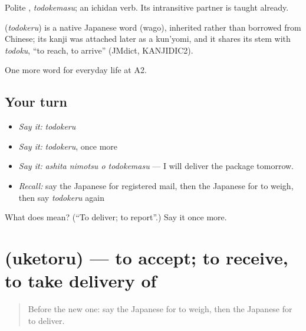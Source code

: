Polite \textbf{}, \emph{todokemasu}; an ichidan verb. Its intransitive partner \textbf{} is taught already.

\begin{cousinweb}
\textbf{} (\emph{todokeru}) is a native Japanese word (wago), inherited rather than borrowed from Chinese; its kanji was attached later as a kun'yomi, and it shares its stem with \emph{todoku}, \textquotedblleft{}to reach, to arrive\textquotedblright{} (JMdict, KANJIDIC2).
\end{cousinweb}

\begin{grammarlens}[title={What you've built}]
One more word for everyday life at A2.
\end{grammarlens}

\subsection*{Your turn}
\begin{itemize}
\raggedright
  \item \emph{Say it:} \emph{todokeru}
  \item \emph{Say it:} \emph{todokeru}, once more
  \item \emph{Say it:} \emph{ashita nimotsu o todokemasu} — I will deliver the package tomorrow.
  \item \emph{Recall:} say the Japanese for registered mail, then the Japanese for to weigh, then say \emph{todokeru} again
\end{itemize}

\begin{tcolorbox}[breakable,colback=teal!4,colframe=teal!35!black,title={Before you move on}]
What does  mean? (\textquotedblleft{}To deliver; to report\textquotedblright{}.) Say it once more.
\end{tcolorbox}
\section[\texorpdfstring{\ja{うけとる} (uketoru)}{うけとる (uketoru)}]{ (uketoru) — to accept; to receive, to take delivery of}

\label{lesson:JA-C189-uketoru}



\begin{quote}
Before the new one: say the Japanese for to weigh, then the Japanese for to deliver.
\end{quote}

